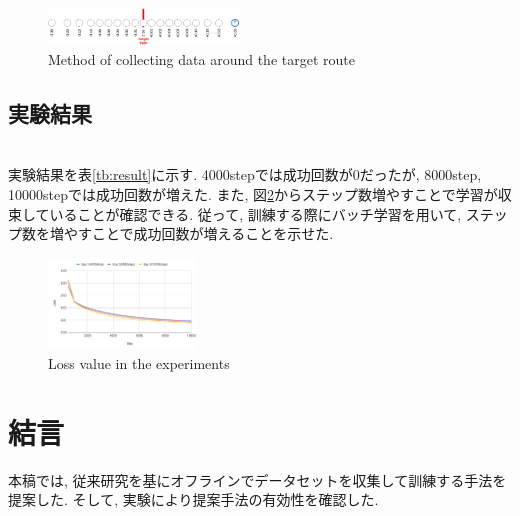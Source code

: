 \documentclass[10pt]{ujarticle}
\begin{document}
    \begin{figure}[h]
        \centering
        \includegraphics[width=0.45\textwidth]{fig/collect-data.png}
        \caption{Method of collecting data around the target route}
        \label{Fig:collect-data}
    \end{figure}

    \subsection{実験結果}\mbox{}\\
    実験結果を表\ref{tb:result}に示す. 4000stepでは成功回数が0だったが, 8000step, 10000stepでは成功回数が増えた. また, 図\ref{Fig:loss}からステップ数増やすことで学習が収束していることが確認できる. 従って, 訓練する際にバッチ学習を用いて, ステップ数を増やすことで成功回数が増えることを示せた. 

    \begin{table}[h]
        \centering
        \caption{Number of successes in the experiment}
        \label{tb:result}
      \end{table}

    \begin{figure}[h]
        \centering
        \includegraphics[width=0.35\textwidth]{fig/chart.png}
        \caption{Loss value in the experiments}
        \label{Fig:loss}
    \end{figure}

    \section{結\hspace{2zw}言}%
    本稿では, 従来研究を基にオフラインでデータセットを収集して訓練する手法を提案した. そして, 実験により提案手法の有効性を確認した. 
\end{document}
